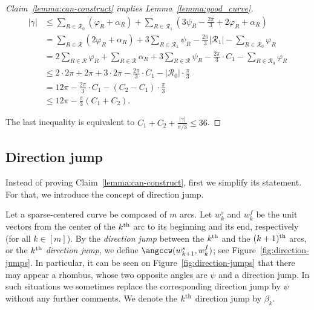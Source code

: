 \begin{proof}[Claim~\ref{lemma:can-construct} implies Lemma~\ref{lemma:good_curve}]
\begin{align*}
    |\gamma| &\leq \sum_{R\in\mathcal{R}_0}(\varphi_R + \alpha_R) + \sum_{R\in\mathcal{R}_1}\left(3\psi_R - \frac{2\pi}{3} + 2\varphi_R + \alpha_R\right)  \\
    &= \sum_{R\in\mathcal{R}}(2\varphi_R + \alpha_R) + 3\sum_{R\in\mathcal{R}_1}\psi_R - \frac{2\pi}{3}|\mathcal{R}_1| - \sum_{R\in\mathcal{R}_0}\varphi_R  \\
    &= 2\sum_{R\in\mathcal{R}}\varphi_R + \sum_{R\in\mathcal{R}}\alpha_R + 3\sum_{R\in\mathcal{R}}\psi_R - \frac{2\pi}{3}\cdot C_1 - \sum_{R\in\mathcal{R}_0}\varphi_R  \\
    &\leq 2\cdot 2\pi + 2\pi + 3\cdot 2\pi - \frac{2\pi}{3}\cdot C_1 - |\mathcal{R}_0|\cdot\frac{\pi}{3}  \\
    &= 12\pi - \frac{2\pi}{3}\cdot C_1 - (C_2 - C_1)\cdot\frac{\pi}{3}  \\
    &\leq 12\pi - \frac{\pi}{3}(C_1 + C_2).
\end{align*}

The last inequality is equivalent to $C_1 + C_2 + \frac{|\gamma|}{\pi/3}\leq 36$.
\end{proof}


\subsection{Direction jump}

Instead of proving Claim~\ref{lemma:can-construct}, first we simplify its statement. For that, we introduce the concept of direction jump.

Let a sparse-centered curve be composed of $m$ arcs. Let $w_k^s$ and $w_k^f$ be the unit vectors from the center of the $k\textsuperscript{th}$ arc to its beginning and its end, respectively (for all $k\in[m]$). By the \emph{direction jump} between the $k\textsuperscript{th}$ and the $(k+1)\textsuperscript{th}$ arcs, or the \emph{$k\textsuperscript{th}$ direction jump}, we define $\angccw(w_{k+1}^s, w_k^f)$; see Figure~\ref{fig:direction-jumps}. In particular, it can be seen on Figure~\ref{fig:direction-jumps} that there may appear a rhombus, whose two opposite angles are $\psi$ and a direction jump. In such situations we sometimes replace the corresponding direction jump by $\psi$ without any further comments. We denote the $k\textsuperscript{th}$ direction jump by $\beta_k$.

